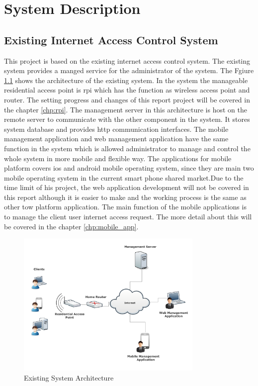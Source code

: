 \chapter{System Description}
\label{chp:system_description}

\section{Existing Internet Access Control System}
\par This project is based on the existing internet access control system. The existing system provides a manged service for the administrator of the system. The Fgiure \ref{fig:presystem} shows the architecture of the existing system. In the system the manageable residential access point is \gls{rpi} which has the function as wireless access point and router. The setting progress and changes of this report project will be covered in the chapter \ref{chp:rpi}. The management server in this architecture is host on the remote server to communicate with the other component in the system. It stores system database and provides \gls{http} communication interfaces. The mobile management application and web management application have the same function in the system which is allowed administrator to manage and control the whole system in more mobile and flexible way. The applications for mobile platform covers \gls{ios} and android mobile operating system, since they are main two mobile operating system in the current smart phone shared market.Due to the time limit of his project, the web application development will not be covered in this report although it is easier to make and the working process is the same as other tow platform application. The main function of the mobile applications is to manage the client user internet access request. The more detail about this will be covered in the chapter \ref{chp:mobile_app}.
\begin{figure}
	\centering
    	\includegraphics[width=0.80\textwidth]{figs/presystem.png}
  	\caption{Existing System Architecture}
  	\label{fig:presystem}
\end{figure}

